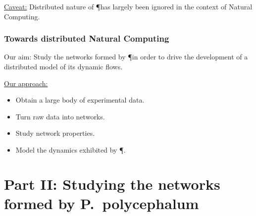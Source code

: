 \documentclass[	hyperref={pdfpagelabels=false}, xcolor=dvipsnames,
		11pt]{beamer}
\begin{document}
\begin{frame}
\begin{columns}
\begin{column}{5cm}
\begin{overprint}
	\end{overprint}
	\end{column}
	\end{columns}
	\vspace{-0.5cm}
	\begin{alertblock}{\underline{Caveat:}}
		Distributed nature of \P has largely been ignored in the context of Natural Computing.
	\end{alertblock}
\end{frame}

\begin{frame}
    \frametitle{Towards distributed Natural Computing} 

    \begin{block}{Our aim:}
    	Study the networks formed by \P in order to drive the development of a distributed model of its dynamic flows.
    \end{block}

	\begin{alertblock}{\underline{Our approach:}}
		\begin{itemize}
			\item Obtain a large body of experimental data.
			\item Turn raw data into networks.
			\item Study network properties.
			\item Model the dynamics exhibited by \P.
		\end{itemize}
	\end{alertblock}
\end{frame}

\section{Part II: Studying the networks formed by P.~polycephalum}
\end{document}
